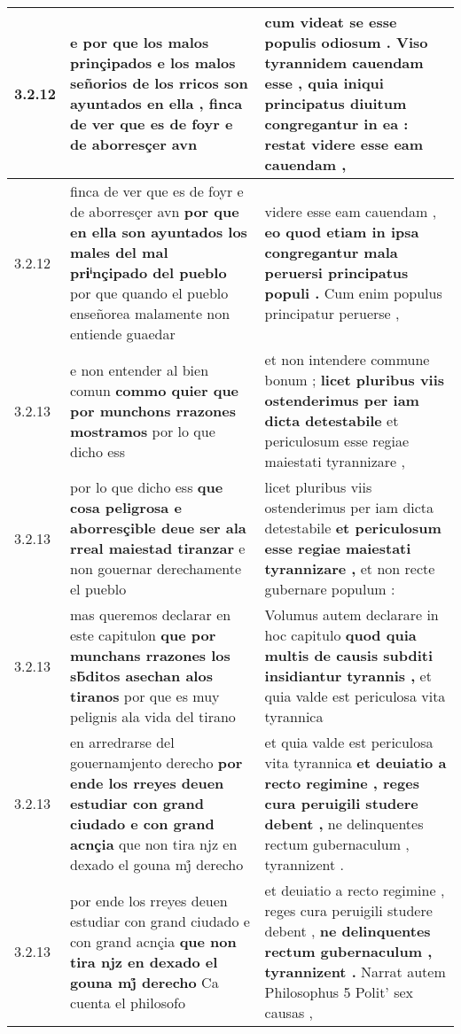 \begin{tabular}{|p{1cm}|p{6.5cm}|p{6.5cm}|}
3.2.12 & e por que los malos prinçipados \textbf{ e los malos señorios de los rricos son ayuntados en ella , } finca de ver que es de foyr e de aborresçer avn & cum videat se esse populis odiosum . Viso tyrannidem cauendam esse , \textbf{ quia iniqui principatus diuitum congregantur in ea : restat } videre esse eam cauendam , \\\hline
3.2.12 & finca de ver que es de foyr e de aborresçer avn \textbf{ por que en ella son ayuntados los males del mal priͥnçipado del pueblo } por que quando el pueblo enseñorea malamente non entiende guaedar & videre esse eam cauendam , \textbf{ eo quod etiam in ipsa congregantur mala peruersi principatus populi . } Cum enim populus principatur peruerse , \\\hline
3.2.13 & e non entender al bien comun \textbf{ commo quier que por munchons rrazones mostramos } por lo que dicho ess & et non intendere commune bonum ; \textbf{ licet pluribus viis ostenderimus per iam dicta detestabile } et periculosum esse regiae maiestati tyrannizare , \\\hline
3.2.13 & por lo que dicho ess \textbf{ que cosa peligrosa e aborresçible deue ser ala rreal maiestad tiranzar } e non gouernar derechamente el pueblo & licet pluribus viis ostenderimus per iam dicta detestabile \textbf{ et periculosum esse regiae maiestati tyrannizare , } et non recte gubernare populum : \\\hline
3.2.13 & mas queremos declarar en este capitulon \textbf{ que por munchans rrazones los sb̃ditos asechan alos tiranos } por que es muy pelignis ala vida del tirano & Volumus autem declarare in hoc capitulo \textbf{ quod quia multis de causis subditi insidiantur tyrannis , } et quia valde est periculosa vita tyrannica \\\hline
3.2.13 & en arredrarse del gouernamjento derecho \textbf{ por ende los rreyes deuen estudiar con grand ciudado e con grand acnçia } que non tira njz en dexado el gouna mj̊ derecho & et quia valde est periculosa vita tyrannica \textbf{ et deuiatio a recto regimine , reges cura peruigili studere debent , } ne delinquentes rectum gubernaculum , tyrannizent . \\\hline
3.2.13 & por ende los rreyes deuen estudiar con grand ciudado e con grand acnçia \textbf{ que non tira njz en dexado el gouna mj̊ derecho } Ca cuenta el philosofo & et deuiatio a recto regimine , reges cura peruigili studere debent , \textbf{ ne delinquentes rectum gubernaculum , tyrannizent . } Narrat autem Philosophus 5 Polit’ sex causas , \\\hline

\end{tabular}
